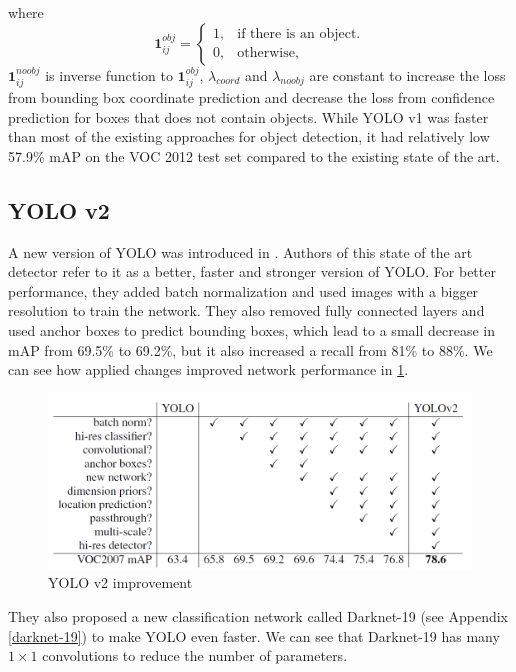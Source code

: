 \documentclass[twoside]{ctuthesis}
\theoremstyle{plain}
\theoremstyle{definition}
\theoremstyle{note}
\begin{document}
where 
\begin{equation}
  \textbf{1}_{ij}^{obj}=\begin{cases}
    1, & \text{if there is an object}.\\
    0, & \text{otherwise},
  \end{cases}
\end{equation}
$\textbf{1}_{ij}^{noobj}$ is inverse function to $\textbf{1}_{ij}^{obj}$, $\lambda_{coord}$ and $\lambda_{noobj}$ are constant to increase the loss from bounding box coordinate prediction and decrease the loss from confidence prediction for boxes that does not contain objects. 
While YOLO v1 was faster than most of the existing approaches for object detection, it had relatively low 57.9\% mAP on the VOC 2012 test set compared to the existing state of the art. 
\subsection{YOLO v2}
A new version of YOLO was introduced in \cite{redmon_farhadi_2017}. Authors of this state of the art detector refer to it as a better, faster and stronger version of YOLO. For better performance, they added batch normalization and used images with a bigger resolution to train the network. They also removed fully connected layers and used anchor boxes to predict bounding boxes, which lead to a small decrease in mAP from 69.5\% to 69.2\%, but it also increased a recall from 81\% to 88\%. We can see how applied changes improved network performance in \ref{yolov2_improve}.
\begin{figure}[h]
\caption{YOLO v2 improvement}
\label{yolov2_improve}
\includegraphics[width=\textwidth]{images/used_networks/yolov2_improve.png}
\end{figure}
They also proposed a new classification network called Darknet-19 (see Appendix \ref{darknet-19}) to make YOLO even faster. We can see that Darknet-19 has many $1\times 1$ convolutions to reduce the number of parameters. 
\end{document}
